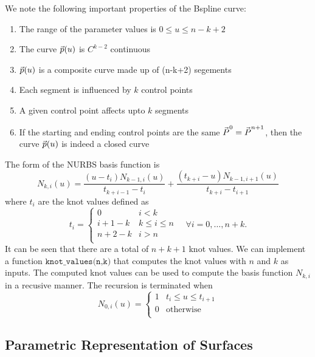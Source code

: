 \documentclass[submit,12pt]{aiaa-pretty} %
\begin{document}
We note the following important properties of the Bspline curve:
\begin{enumerate}
\item The range of the parameter values is $0 \le u \le n-k+2$
\item The curve $\vec{\mkern0mup}(u)$ is $C^{k-2}$ continuous
\item $\vec{\mkern0mup}(u)$ is a composite curve made up of (n-k+2) segements
\item Each segment is influenced by $k$ control points
\item A given control point affects upto $k$ segments
\item If the starting and ending control points are the same $\vec{\mkern0muP}^0  = \vec{\mkern0muP}^{n+1}$, then the curve $\vec{\mkern0mup}(u)$ is indeed a closed curve
\end{enumerate}
The form of the NURBS basis function is
\begin{equation}
  N_{k,i}(u) = \frac{(u-t_i) N_{k-1,i}(u)}{t_{k+i-1}-t_i} + \frac{(t_{k+i}-u)N_{k-1,i+1}(u)}{t_{k+i}-t_{i+1}}
\end{equation}
where $t_i$ are the knot values defined as 
\begin{equation}
  t_i =
  \begin{cases}
    0 & i < k\\
    i+1 - k & k \le i \le n \\
    n+2 - k & i > n\\ 
  \end{cases}
\quad \forall i = 0,\ldots, n+k.
\end{equation}
It can be seen that there are a total of $n+k+1$ knot values. We can
implement a function $\texttt{knot\_values(n,k)}$ that computes the
knot values with $n$ and $k$ as inputs. The computed knot values can
be used to compute the basis function $N_{k,i}$ in a recusive manner.
The recursion is terminated when
\begin{equation}
  N_{0,i}(u) = 
  \begin{cases}
    1 & t_i \le u \le t_{i+1}    \\
    0 & \mathrm{otherwise} \\
  \end{cases}
\end{equation}

\subsection{Parametric Representation of Surfaces}
\end{document}
